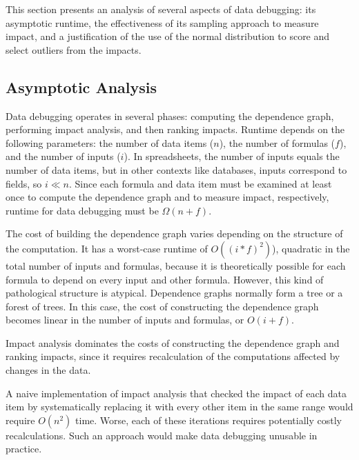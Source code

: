 
This section presents an analysis of several aspects of data
debugging: its asymptotic runtime, the effectiveness of its sampling
approach to measure impact, and a justification of the use of the
normal distribution to score and select outliers from the impacts.

\subsection{Asymptotic Analysis}
\label{sec:asymptotic_analysis}

Data debugging operates in several phases: computing the dependence
graph, performing impact analysis, and then ranking impacts. Runtime
depends on the following parameters: the number of data items ($n$),
the number of formulas ($f$), and the number of inputs ($i$). In
spreadsheets, the number of inputs equals the number of data items,
but in other contexts like databases, inputs correspond to fields, so
$i \ll n$. Since each formula and data item must be examined at least
once to compute the dependence graph and to measure impact,
respectively, runtime for data debugging must be 
$\Omega(n+f)$.

The cost of building the dependence graph varies depending on the
structure of the computation. It has a worst-case runtime of
$O((i*f)^2)$), quadratic in the total number of inputs and formulas,
because it is theoretically possible for each formula to depend on
every input and other formula. However, this kind of pathological
structure is atypical. Dependence graphs normally form a tree or a
forest of trees. In this case, the cost of constructing the dependence
graph becomes linear in the number of inputs and formulas, or
$O(i+f)$.

Impact analysis dominates the costs of constructing the dependence
graph and ranking impacts, since it requires recalculation of the
computations affected by changes in the data.

A naive implementation of impact analysis that checked the impact of
each data item by systematically replacing it with every other item in
the same range would require $O(n^2)$ time. Worse, each of these
iterations requires potentially costly recalculations. Such an
approach would make data debugging unusable in practice.
 
